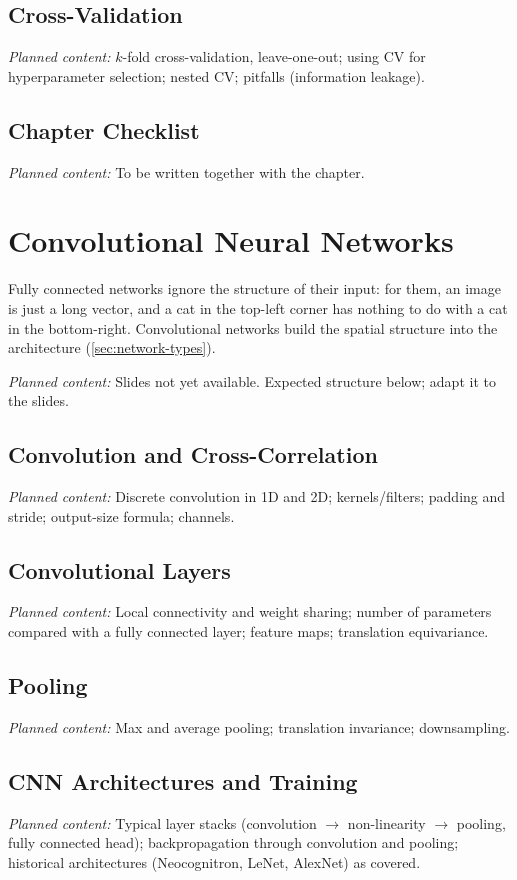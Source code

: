 \documentclass[11pt, oneside]{book}
\newcommand{\planned}[1]{%
  \par{\small\color{gray!70!black}\textit{Planned content:} #1}\par}
\let\originalsection\section
\renewcommand{\section}{\Needspace{7\baselineskip}\originalsection}
\begin{document}
\section{Cross-Validation}
\planned{$k$-fold cross-validation, leave-one-out; using CV for
hyperparameter selection; nested CV; pitfalls (information leakage).}

\section{Chapter Checklist}
\planned{To be written together with the chapter.}


\chapter{Convolutional Neural Networks}
\label{ch:cnn}

Fully connected networks ignore the structure of their input: for them, an
image is just a long vector, and a cat in the top-left corner has nothing to
do with a cat in the bottom-right. Convolutional networks build the spatial
structure into the architecture (\cref{sec:network-types}).

\planned{Slides not yet available. Expected structure below; adapt it to the
slides.}

\section{Convolution and Cross-Correlation}
\planned{Discrete convolution in 1D and 2D; kernels/filters; padding and
stride; output-size formula; channels.}

\section{Convolutional Layers}
\planned{Local connectivity and weight sharing; number of parameters
compared with a fully connected layer; feature maps; translation
equivariance.}

\section{Pooling}
\planned{Max and average pooling; translation invariance; downsampling.}

\section{CNN Architectures and Training}
\planned{Typical layer stacks (convolution $\to$ non-linearity $\to$
pooling, fully connected head); backpropagation through convolution and
pooling; historical architectures (Neocognitron, LeNet, AlexNet) as
covered.}
\end{document}
